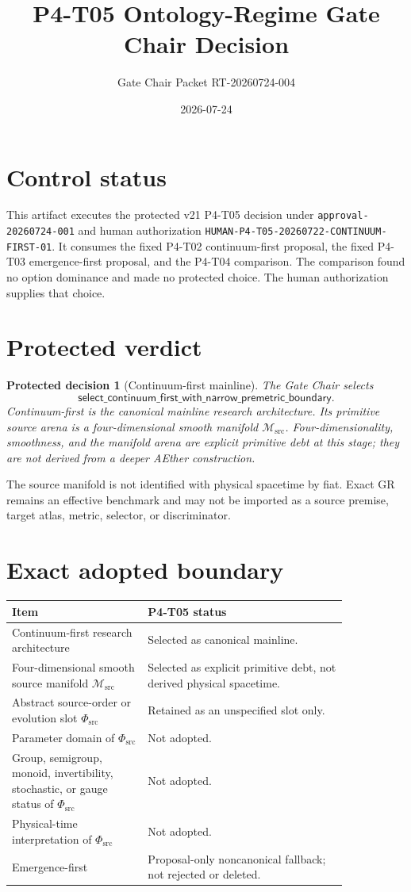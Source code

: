 \documentclass[11pt]{article}
\title{P4-T05 Ontology-Regime Gate Chair Decision}
\author{Gate Chair Packet RT-20260724-004}
\date{2026-07-24}
\newcommand{\Msrc}{\mathcal{M}_{\mathrm{src}}}
\newcommand{\PhiSrc}{\Phi_{\mathrm{src}}}
\newcommand{\GateDecision}{\mathsf{select\_continuum\_first\_with\_narrow\_premetric\_boundary}}
\newtheorem{verdict}{Protected decision}
\begin{document}
\maketitle

\section{Control status}

This artifact executes the protected v21 P4-T05 decision under
\texttt{approval-20260724-001} and human authorization
\texttt{HUMAN-P4-T05-20260722-CONTINUUM-FIRST-01}.  It consumes the fixed
P4-T02 continuum-first proposal, the fixed P4-T03 emergence-first proposal,
and the P4-T04 comparison.  The comparison found no option dominance and made
no protected choice.  The human authorization supplies that choice.

\section{Protected verdict}

\begin{verdict}[Continuum-first mainline]
The Gate Chair selects
\[
  \GateDecision .
\]
Continuum-first is the canonical mainline \emph{research architecture}.  Its
primitive source arena is a four-dimensional smooth manifold \(\Msrc\).
Four-dimensionality, smoothness, and the manifold arena are explicit primitive
debt at this stage; they are not derived from a deeper AEther construction.
\end{verdict}

The source manifold is not identified with physical spacetime by fiat.  Exact
GR remains an effective benchmark and may not be imported as a source premise,
target atlas, metric, selector, or discriminator.

\section{Exact adopted boundary}

\begin{longtable}{p{0.34\linewidth}p{0.50\linewidth}}
\toprule
Item & P4-T05 status \\
\midrule
Continuum-first research architecture & Selected as canonical mainline. \\
Four-dimensional smooth source manifold \(\Msrc\) & Selected as explicit
primitive debt, not derived physical spacetime. \\
Abstract source-order or evolution slot \(\PhiSrc\) & Retained as an
unspecified slot only. \\
Parameter domain of \(\PhiSrc\) & Not adopted. \\
Group, semigroup, monoid, invertibility, stochastic, or gauge status of
\(\PhiSrc\) & Not adopted. \\
Physical-time interpretation of \(\PhiSrc\) & Not adopted. \\
Emergence-first & Proposal-only noncanonical fallback; not rejected or
deleted. \\
\bottomrule
\end{longtable}
\end{document}

